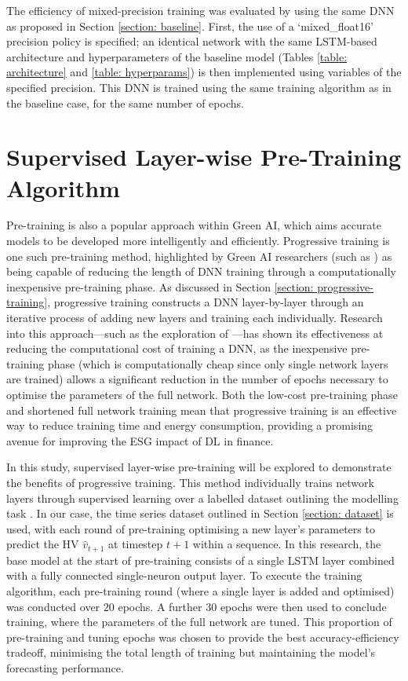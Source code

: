 \documentclass[a4paper, 11pt]{report}
\begin{document}
    The efficiency of mixed-precision training was evaluated by using the same DNN as proposed in Section \ref{section: baseline}. First, the use of a `mixed\_float16' precision policy is specified; an identical network with the same LSTM-based architecture and hyperparameters of the baseline model (Tables \ref{table: architecture} and \ref{table: hyperparams}) is then implemented using variables of the specified precision. This DNN is trained using the same training algorithm as in the baseline case, for the same number of epochs.


    \section{Supervised Layer-wise Pre-Training Algorithm}

    Pre-training is also a popular approach within Green AI, which aims accurate models to be developed more intelligently and efficiently. Progressive training is one such pre-training method, highlighted by Green AI researchers (such as \citet{xu-2021}) as being capable of reducing the length of DNN training through a computationally inexpensive pre-training phase. As discussed in Section \ref{section: progressive-training}, progressive training constructs a DNN layer-by-layer through an iterative process of adding new layers and training each individually. Research into this approach---such as the exploration of \citet{ienco-2019}---has shown its effectiveness at reducing the computational cost of training a DNN, as the inexpensive pre-training phase (which is computationally cheap since only single network layers are trained) allows a significant reduction in the number of epochs necessary to optimise the parameters of the full network. Both the low-cost pre-training phase and shortened full network training mean that progressive training is an effective way to reduce training time and energy consumption, providing a promising avenue for improving the ESG impact of DL in finance.

    In this study, supervised layer-wise pre-training will be explored to demonstrate the benefits of progressive training. This method individually trains network layers through supervised learning over a labelled dataset outlining the modelling task \citep{ienco-2019}. In our case, the time series dataset outlined in Section \ref{section: dataset} is used, with each round of pre-training optimising a new layer's parameters to predict the HV $\hat{v}_{t+1}$ at timestep $t+1$ within a sequence. In this research, the base model at the start of pre-training consists of a single LSTM layer combined with a fully connected single-neuron output layer. To execute the training algorithm, each pre-training round (where a single layer is added and optimised) was conducted over $20$ epochs. A further $30$ epochs were then used to conclude training, where the parameters of the full network are tuned. This proportion of pre-training and tuning epochs was chosen  to provide the best accuracy-efficiency tradeoff, minimising the total length of training but maintaining the model's forecasting performance. 
\end{document}
